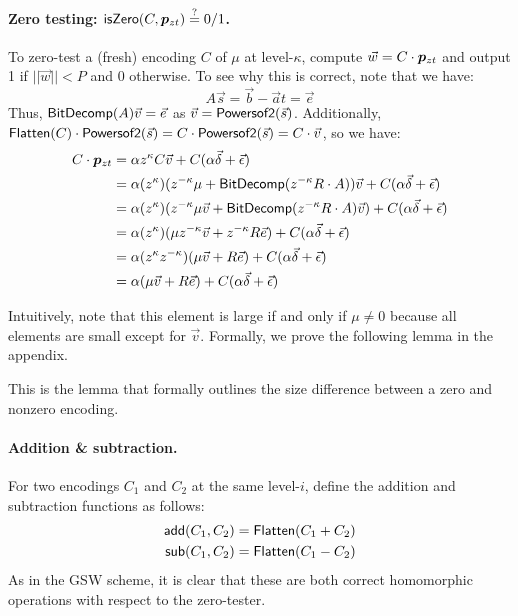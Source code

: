 \paragraph{Zero testing:  $\mathsf{isZero}(C, \bm{p}_{zt}) \stackrel{?}{=} 0/1$.}  To zero-test a (fresh) encoding $C$ of $\mu$ at level-$\kappa$, compute $\vec{w} = C\cdot \bm{p}_{zt}$ and output 1 if $||\vec{w}|| < P$ and 0 otherwise.  To see why this is correct, note that we have:  $$A\vec{s} = \vec{b} - \vec{a}t = \vec{e}$$  Thus, $\mathsf{BitDecomp}(A)\vec{v} = \vec{e}$ as $\vec{v} = \mathsf{Powersof2}(\vec{s})$.  Additionally, $\mathsf{Flatten}(C)\cdot\mathsf{Powersof2}(\vec{s}) = C\cdot \mathsf{Powersof2}(\vec{s}) = C\cdot\vec{v}$, so we have:
\begin{align*}
C\cdot \bm{p}_{zt} &= \alpha z^\kappa C\vec{v} + C(\alpha\vec{\delta} + \vec{\epsilon})\\
&= \alpha(z^\kappa)(z^{-\kappa}\mu + \mathsf{BitDecomp}(z^{-\kappa}R\cdot A))\vec{v} + C(\alpha\vec{\delta} + \vec{\epsilon})\\
&= \alpha(z^\kappa)(z^{-\kappa}\mu \vec{v} + \mathsf{BitDecomp}(z^{-\kappa}R\cdot A)\vec{v}) + C(\alpha\vec{\delta} + \vec{\epsilon})\\
&= \alpha(z^\kappa)(\mu z^{-\kappa}\vec{v} + z^{-\kappa}R\vec{e}) + C(\alpha\vec{\delta} + \vec{\epsilon})\\
&= \alpha(z^\kappa z^{-\kappa})(\mu \vec{v} + R\vec{e}) + C(\alpha\vec{\delta} + \vec{\epsilon})\\
&= \alpha(\mu \vec{v} + R\vec{e}) + C(\alpha\vec{\delta} + \vec{\epsilon})
\end{align*} 

Intuitively, note that this element is large if and only if $\mu \not= 0$ because all elements are small except for $\vec{v}$.  Formally, we prove the following lemma in the appendix.

\begin{lemma}
\label{zerotesting}
This is the lemma that formally outlines the size difference between a zero and nonzero encoding.
\end{lemma}

\paragraph{Addition \& subtraction.}  For two encodings $C_1$ and $C_2$ at the same level-$i$, define the addition and subtraction functions as follows:
\begin{align*}
\mathsf{add}(C_1,C_2) &= \mathsf{Flatten}(C_1 + C_2)\\
\mathsf{sub}(C_1,C_2) &= \mathsf{Flatten}(C_1 - C_2)
\end{align*}
As in the GSW scheme, it is clear that these are both correct homomorphic operations with respect to the zero-tester.

